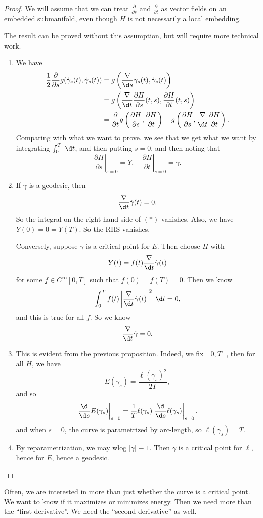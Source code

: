 \documentclass[a4paper]{article}
\begin{document}
\begin{proof}
  We will assume that we can treat $\frac{\partial}{\partial s}$ and $\frac{\partial}{\partial t}$ as vector fields on an embedded submanifold, even though $H$ is not necessarily a local embedding.

  The result can be proved without this assumption, but will require more technical work.
  \begin{enumerate}
    \item We have
      \begin{align*}
        \frac{1}{2} \frac{\partial}{\partial s} g(\dot{\gamma}_s(t), \dot{\gamma}_s(t)) &= g\left(\frac{\nabla}{\d s} \dot{\gamma}_s(t), \dot{\gamma}_s(t)\right)\\
        &= g\left(\frac{\nabla}{\d t} \frac{\partial H}{\partial s}(t, s), \frac{\partial H}{\partial t} (t, s)\right)\\
        &= \frac{\partial}{\partial t} g\left(\frac{\partial H}{\partial s}, \frac{\partial H}{\partial t}\right) - g \left(\frac{\partial H}{\partial s}, \frac{\nabla}{\d t} \frac{\partial H}{\partial t}\right).
      \end{align*}
      Comparing with what we want to prove, we see that we get what we want by integrating $\int_0^T\;\d t$, and then putting $s = 0$, and then noting that
      \[
        \left.\frac{\partial H}{\partial s}\right|_{s = 0} = Y,\quad \left.\frac{\partial H}{\partial t}\right|_{s = 0} = \dot{\gamma}.
      \]
    \item If $\gamma$ is a geodesic, then
      \[
        \frac{\nabla}{\d t} \dot{\gamma}(t) = 0.
      \]
      So the integral on the right hand side of $(*)$ vanishes. Also, we have $Y(0) = 0 = Y(T)$. So the RHS vanishes.

      Conversely, suppose $\gamma$ is a critical point for $E$. Then choose $H$ with
      \[
        Y(t) = f(t) \frac{\nabla}{\d t} \dot{\gamma}(t)
      \]
      for some $f \in C^\infty[0, T]$ such that $f(0) = f(T) = 0$. Then we know
      \[
        \int_0^T f(t) \left|\frac{\nabla}{\d t} \dot{\gamma}(t)\right|^2 \;\d t = 0,
      \]
      and this is true for all $f$. So we know
      \[
        \frac{\nabla}{\d t}\dot{\gamma} = 0.
      \]
    \item This is evident from the previous proposition. Indeed, we fix $[0, T]$, then for all $H$, we have
      \[
        E(\gamma_s) = \frac{\ell (\gamma_s)^2}{2T},
      \]
      and so
      \[
        \left.\frac{\d}{\d s} E(\gamma_s)\right|_{s = 0} = \frac{1}{T} \ell(\gamma_s) \left.\frac{\d}{\d s}\ell(\gamma_s) \right|_{s = 0},
      \]
     and when $s = 0$, the curve is parametrized by arc-length, so $\ell(\gamma_s) = T$.
   \item By reparametrization, we may wlog $|\dot{\gamma}| \equiv 1$. Then $\gamma$ is a critical point for $\ell$, hence for $E$, hence a geodesic.\qedhere
  \end{enumerate}
\end{proof}
Often, we are interested in more than just whether the curve is a critical point. We want to know if it maximizes or minimizes energy. Then we need more than the ``first derivative''. We need the ``second derivative'' as well.
\end{document}
